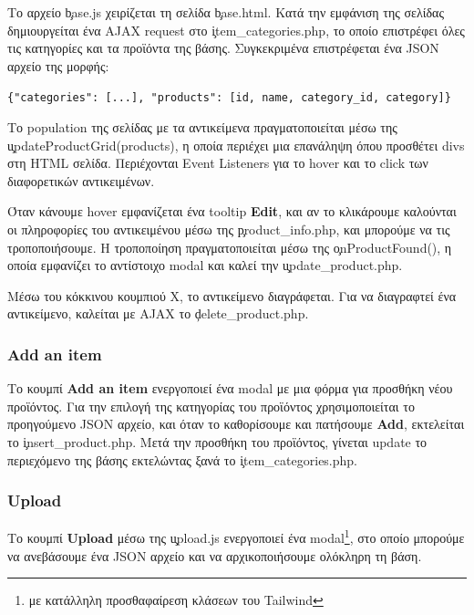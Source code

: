         Το αρχείο \c{base.js} χειρίζεται τη σελίδα \c{base.html}.
        Κατά την εμφάνιση της σελίδας δημιουργείται ένα AJAX request στο \c{item\_categories.php}, το οποίο επιστρέφει όλες τις κατηγορίες και τα προϊόντα της βάσης.
        Συγκεκριμένα επιστρέφεται ένα JSON αρχείο της μορφής:

        \begin{graycomment}
            \verb|{"categories": [...], "products": [id, name, category_id, category]}|
        \end{graycomment}

        Το population της σελίδας με τα αντικείμενα πραγματοποιείται μέσω της \c{updateProductGrid(products)}, η οποία περιέχει μια επανάληψη όπου προσθέτει divs στη HTML σελίδα.
        Περιέχονται Event Listeners για το hover και το click των διαφορετικών αντικειμένων.

        Όταν κάνουμε hover εμφανίζεται ένα tooltip \textbf{Edit}, και αν το κλικάρουμε καλούνται οι πληροφορίες του αντικειμένου μέσω της \c{product\_info.php}, και μπορούμε να τις τροποποιήσουμε.
        Η τροποποίηση πραγματοποιείται μέσω της \c{onProductFound()}, η οποία εμφανίζει το αντίστοιχο modal και καλεί την \c{update\_product.php}.

        Μέσω του κόκκινου κουμπιού Χ, το αντικείμενο διαγράφεται.
        Για να διαγραφτεί ένα αντικείμενο, καλείται με AJAX το \c{delete\_product.php}.

        \subsubsection{Add an item}
            Το κουμπί \textbf{Add an item} ενεργοποιεί ένα modal με μια φόρμα για προσθήκη νέου προϊόντος.
            Για την επιλογή της κατηγορίας του προϊόντος χρησιμοποιείται το προηγούμενο JSON αρχείο, και όταν το καθορίσουμε και πατήσουμε \textbf{Add}, εκτελείται το \c{insert\_product.php}.
            Μετά την προσθήκη του προϊόντος, γίνεται update το περιεχόμενο της βάσης εκτελώντας ξανά το \c{item\_categories.php}.

        \subsubsection{Upload}
            Το κουμπί \textbf{Upload} μέσω της \c{upload.js} ενεργοποιεί ένα modal\footnote{με κατάλληλη προσθαφαίρεση κλάσεων του Tailwind}, στο οποίο μπορούμε να ανεβάσουμε ένα JSON αρχείο και να αρχικοποιήσουμε ολόκληρη τη βάση.

